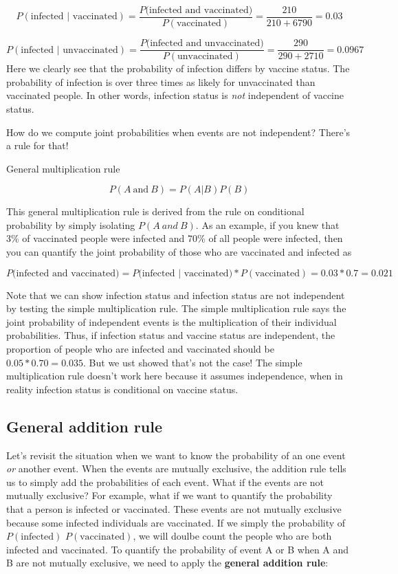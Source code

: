 \documentclass[
]{book}
\begin{document}
\[
P(\text{infected | vaccinated}) = \frac{P(\text{infected and vaccinated)}}{P(\text{vaccinated})}=\frac{210}{210+6790}=0.03
\]

\[
P(\text{infected | unvaccinated}) = \frac{P(\text{infected and unvaccinated)}}{P(\text{unvaccinated})}=\frac{290}{290+2710}=0.0967
\] Here we clearly see that the probability of infection differs by vaccine status. The probability of infection is over three times as likely for unvaccinated than vaccinated people. In other words, infection status is \emph{not} independent of vaccine status.

How do we compute joint probabilities when events are not independent? There's a rule for that!

General multiplication rule

\[
P(A\ \text{and}\ B) = P(A|B)P(B)
\]

This general multiplication rule is derived from the rule on conditional probability by simply isolating \(P(A\ and\ B)\). As an example, if you knew that 3\% of vaccinated people were infected and 70\% of all people were infected, then you can quantify the joint probability of those who are vaccinated and infected as

\[
P(\text{infected and vaccinated)} = P(\text{infected | vaccinated)}*P(\text{vaccinated})=0.03*0.7=0.021
\]

Note that we can show infection status and infection status are not independent by testing the simple multiplication rule. The simple multiplication rule says the joint probability of independent events is the multiplication of their individual probabilities. Thus, if infection status and vaccine status are independent, the proportion of people who are infected and vaccinated should be \(0.05*0.70=0.035\). But we ust showed that's not the case! The simple multiplication rule doesn't work here because it assumes independence, when in reality infection status is conditional on vaccine status.

\subsection{General addition rule}\label{general-addition-rule}

Let's revisit the situation when we want to know the probability of an one event \emph{or} another event. When the events are mutually exclusive, the addition rule tells us to simply add the probabilities of each event. What if the events are not mutually exclusive? For example, what if we want to quantify the probability that a person is infected or vaccinated. These events are not mutually exclusive because some infected individuals are vaccinated. If we simply the probability of \(P(\text{infected})\) \(P(\text{vaccinated})\), we will doulbe count the people who are both infected and vaccinated. To quantify the probability of event A or B when A and B are not mutually exclusive, we need to apply the \textbf{general addition rule}:
\end{document}
